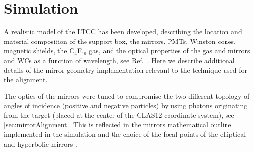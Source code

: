\section{Simulation}

A realistic model of the LTCC has been developed, describing the location and material composition
of the support box, the mirrors, PMTs, Winston cones, magnetic shields, the C$_4$F$_{10}$ gas, and the
optical properties of the gas and mirrors and WCs as a function of wavelength, see Ref.~\cite{sim-nim}.
Here we describe additional details of the mirror geometry implementation relevant to the technique
used for the alignment.

The optics of the mirrors were tuned to compromise the two different topology of angles of incidence
(positive and negative particles) by using photons originating from the target (placed at the center of the CLAS12 coordinate system),
see \ref{sec:mirrorAlignment}.
This is reflected in the mirrors mathematical outline implemented in the simulation and the choice of the
focal points of the elliptical and hyperbolic mirrors .

